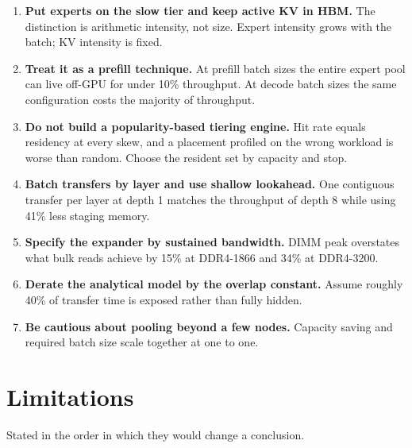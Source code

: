 \documentclass[10pt,a4paper]{article}
\begin{document}
\begin{enumerate}[leftmargin=*]
\item \textbf{Put experts on the slow tier and keep active KV in HBM.} The
distinction is arithmetic intensity, not size. Expert intensity grows with the
batch; KV intensity is fixed.

\item \textbf{Treat it as a prefill technique.} At prefill batch sizes the entire
expert pool can live off-GPU for under 10\% throughput. At decode batch sizes the
same configuration costs the majority of throughput.

\item \textbf{Do not build a popularity-based tiering engine.} Hit rate equals
residency at every skew, and a placement profiled on the wrong workload is worse
than random. Choose the resident set by capacity and stop.

\item \textbf{Batch transfers by layer and use shallow lookahead.} One contiguous
transfer per layer at depth 1 matches the throughput of depth 8 while using 41\%
less staging memory.

\item \textbf{Specify the expander by sustained bandwidth.} DIMM peak overstates
what bulk reads achieve by 15\% at DDR4-1866 and 34\% at DDR4-3200.

\item \textbf{Derate the analytical model by the overlap constant.} Assume roughly
40\% of transfer time is exposed rather than fully hidden.

\item \textbf{Be cautious about pooling beyond a few nodes.} Capacity saving and
required batch size scale together at one to one.
\end{enumerate}

\section{Limitations}

Stated in the order in which they would change a conclusion.
\end{document}
